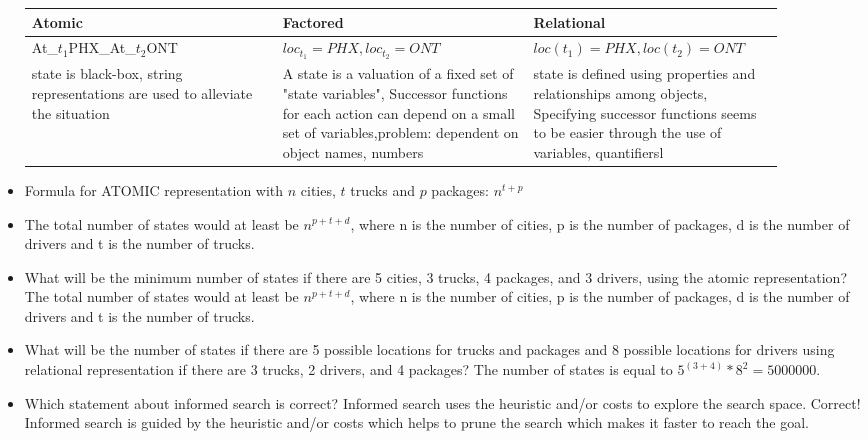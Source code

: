 \documentclass[10pt]{article}
\begin{document}
\begin{itemize}[label=\(\star\), leftmargin=1em, itemsep=-0.3em]
\begin{table}[h]
    \small
    \begin{tabular}{|p{0.3\linewidth}|p{0.3\linewidth}|p{0.3\linewidth}|}
    \hline
        Atomic & Factored & Relational\\ \hline
        At\_$t_1$PHX\_At\_$t_2$ONT & $loc_{t_1} = PHX, loc_{t_2} = ONT$ & $loc(t_1) = PHX, loc(t_2) = ONT$\\ \hline
        state is black-box, string representations are used to alleviate the situation &  A state is a valuation of a fixed set of "state variables", Successor functions for each action can depend on a small set of variables,problem: dependent on object names, numbers &  state is defined using properties and relationships among objects, Specifying successor functions seems to be easier through the use of variables, quantifiersl\\ \hline
    \end{tabular}
\end{table}




\item Formula for ATOMIC representation with $n$ cities, $t$ trucks and $p$ packages: $n^{t + p}$
\item The total number of states would at least be $n^{p+t+d}$, where n is the number of cities, p is the number of packages, d is the number of drivers and t is the number of trucks.






    \item What will be the minimum number of states if there are 5 cities, 3 trucks, 4 packages, and 3 drivers, using the atomic representation? The total number of states would at least be $n^{p+t+d}$, where n is the number of cities, p is the number of packages, d is the number of drivers and t is the number of trucks.

    \item What will be the number of states if there are 5 possible locations for trucks and packages and 8 possible locations for drivers using relational representation if there are 3 trucks, 2 drivers, and 4 packages? The number of states is equal to $5^(3+4) * 8 ^2 = 5000000$.


    \item Which statement about informed search is correct? Informed search uses the heuristic and/or costs to explore the search space. Correct! Informed search is guided by the heuristic and/or costs which helps to prune the search which makes it faster to reach the goal.



\end{itemize}
\end{document}
